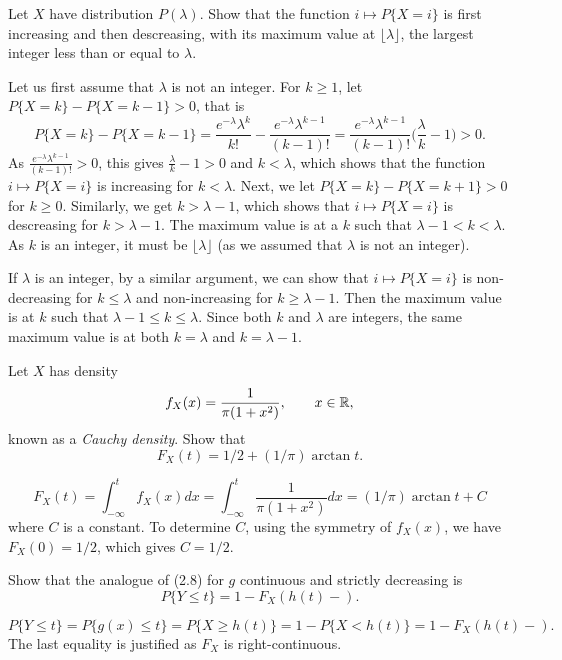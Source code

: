 \begin{exercise}
  Let $X$ have distribution $P(\lambda)$. Show that the function $i\mapsto P\{X=i\}$ is first increasing and then descreasing, with its maximum value at $\lfloor\lambda\rfloor$, the largest integer less than or equal to $\lambda$.
\end{exercise}
\begin{solution}
  Let us first assume that $\lambda$ is not an integer. For $k\geq 1$, let $P\{X=k\} - P\{X=k-1\} > 0$, that is
  \[ P\{X=k\} - P\{X=k-1\} = \frac{e^{-\lambda}\lambda^{k}}{k!} - \frac{e^{-\lambda}\lambda^{k-1}}{(k-1)!} = \frac{e^{-\lambda}\lambda^{k-1}}{(k-1)!}\big(\frac{\lambda}{k} -1\big) > 0 .\]
  As $\frac{e^{-\lambda}\lambda^{k-1}}{(k-1)!}>0$, this gives $\frac{\lambda}{k}-1> 0$ and $k<\lambda$, which shows that the function $i\mapsto P\{X=i\}$ is increasing for $k<\lambda$. Next, we let $P\{X=k\} - P\{X=k+1\} > 0$ for $k\geq 0$. Similarly, we get $k > \lambda - 1$, which shows that $i\mapsto P\{X=i\}$ is descreasing for $k>\lambda - 1$. The maximum value is at a $k$ such that $\lambda-1<k<\lambda$. As $k$ is an integer, it must be $\lfloor\lambda\rfloor$ (as we assumed that $\lambda$ is not an integer).

  If $\lambda$ is an integer, by a similar argument, we can show that $i\mapsto P\{X=i\}$ is non-decreasing for $k\leq\lambda$ and non-increasing for $k\geq\lambda-1$. Then the maximum value is at $k$ such that $\lambda-1\leq k\leq \lambda$. Since both $k$ and $\lambda$ are integers, the same maximum value is at both $k=\lambda$ and $k=\lambda -1$.
\end{solution}


\begin{exercise}
  Let $X$ has density
  \[ f_X(x) = \frac{1}{\pi(1+x^2)},\qquad x\in\mathbb{R}, \]
  known as a \textit{Cauchy density}. Show that
  \[ F_X(t) = 1/2 + (1/\pi)\arctan t. \]
\end{exercise}
\begin{solution}
  \[ F_X(t) = \int_{-\infty}^t f_X(x)dx = \int_{-\infty}^t\frac{1}{\pi(1+x^2)}dx = (1/\pi)\arctan t + C \]
  where $C$ is a constant. To determine $C$, using the symmetry of $f_X(x)$, we have $F_X(0)=1/2$, which gives $C=1/2$.
\end{solution}


\begin{exercise}
  Show that the analogue of (2.8) for $g$ continuous and strictly decreasing is
  \[ P\{Y\leq t\}=1-F_X(h(t)-). \]
\end{exercise}
\begin{solution}
  \[ P\{Y\leq t\} = P\{g(x)\leq t\} = P\{X\geq h(t)\} = 1 - P\{X<h(t)\} = 1 - F_X(h(t)-). \]
  The last equality is justified as $F_X$ is right-continuous.
\end{solution}
